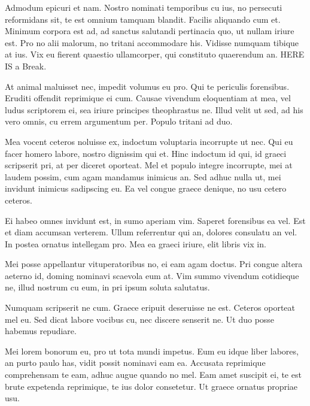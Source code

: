 \documentclass[10pt,]{book}
\makeatletter
\newcommand*{\pen@ltyabovepfbreak}{2}
\newcommand*{\pen@ltybelowpfbreak}{-4}
\newlength{\pfbreakskip}
\newcommand{\pfbreak}{\@ifstar{\@spfbreakgap}{\@pfbreakgap}}
\newcommand{\@pfbreakgap}{%
  \par {%
  \skip@\lastskip
  \nobreak
  \vskip -\ifdim\prevdepth>\maxdepth \maxdepth
          \else\ifdim\prevdepth>-1000pt\prevdepth
            \else\ifinner 0pt
              \else \pagedepth
          \fi \fi \fi
  \vskip -\skip@
  \ifdim\skip@<\pfbreakskip
    \advance\skip@ -1\skip@ \advance\skip@ 1\pfbreakskip
  \fi
  \penalty\pen@ltyabovepfbreak
  \vskip\skip@
  \penalty\pen@ltybelowpfbreak
  }
  \@afterindentfalse
  \@afterheading
}
\newcommand{\@spfbreakgap}{%
  \par {%
  \skip@\lastskip
  \nobreak
  \vskip -\ifdim\prevdepth>\maxdepth \maxdepth
          \else\ifdim\prevdepth>-1000pt\prevdepth
            \else\ifinner 0pt
              \else \pagedepth
          \fi \fi \fi
  \vskip -\skip@
  \ifdim\skip@<\pfbreakskip
    \advance\skip@ -1\skip@ \advance\skip@ 1\pfbreakskip
  \fi
  \penalty\pen@ltyabovepfbreak
  \vskip\skip@
  \penalty\pen@ltybelowpfbreak
  }
  \@afterindenttrue
  \@afterheading
}
\let\OldRule\rule
\renewcommand{\rule}[2]{\OldRule[0pt]{0pt}{#2}\pfbreak{}}
\makeatother
\begin{document}
Admodum epicuri et nam. Nostro nominati temporibus cu ius, no persecuti
reformidans sit, te est omnium tamquam blandit. Facilis aliquando cum
et. Minimum corpora est ad, ad sanctus salutandi pertinacia quo, ut
nullam iriure est. Pro no alii malorum, no tritani accommodare his.
Vidisse numquam tibique at ius. Vix eu fierent quaestio ullamcorper, qui
constituto quaerendum an. HERE IS a Break.

\begin{center}\rule{0.5\linewidth}{\linethickness}\end{center}

At animal maluisset nec, impedit volumus eu pro. Qui te periculis
forensibus. Eruditi offendit reprimique ei cum. Causae vivendum
eloquentiam at mea, vel ludus scriptorem ei, sea iriure principes
theophrastus ne. Illud velit ut sed, ad his vero omnis, cu errem
argumentum per. Populo tritani ad duo.

Mea vocent ceteros noluisse ex, indoctum voluptaria incorrupte ut nec.
Qui eu facer homero labore, nostro dignissim qui et. Hinc indoctum id
qui, id graeci scripserit pri, at per diceret oporteat. Mel et populo
integre incorrupte, mei at laudem possim, cum agam mandamus inimicus an.
Sed adhuc nulla ut, mei invidunt inimicus sadipscing eu. Ea vel congue
graece denique, no usu cetero ceteros.

Ei habeo omnes invidunt est, in sumo aperiam vim. Saperet forensibus ea
vel. Est et diam accumsan verterem. Ullum referrentur qui an, dolores
consulatu an vel. In postea ornatus intellegam pro. Mea ea graeci
iriure, elit libris vix in.

Mei posse appellantur vituperatoribus no, ei eam agam doctus. Pri congue
altera aeterno id, doming nominavi scaevola eum at. Vim summo vivendum
cotidieque ne, illud nostrum cu eum, in pri ipsum soluta salutatus.

Numquam scripserit ne cum. Graece eripuit deseruisse ne est. Ceteros
oporteat mel eu. Sed dicat labore vocibus cu, nec discere senserit ne.
Ut duo posse habemus repudiare.

\begin{center}\rule{0.5\linewidth}{\linethickness}\end{center}

Mei lorem bonorum eu, pro ut tota mundi impetus. Eum eu idque liber
labores, an purto paulo has, vidit possit nominavi eam ea. Accusata
reprimique comprehensam te eam, adhuc augue quando no mel. Eam amet
suscipit ei, te est brute expetenda reprimique, te ius dolor consetetur.
Ut graece ornatus propriae usu.
\end{document}
